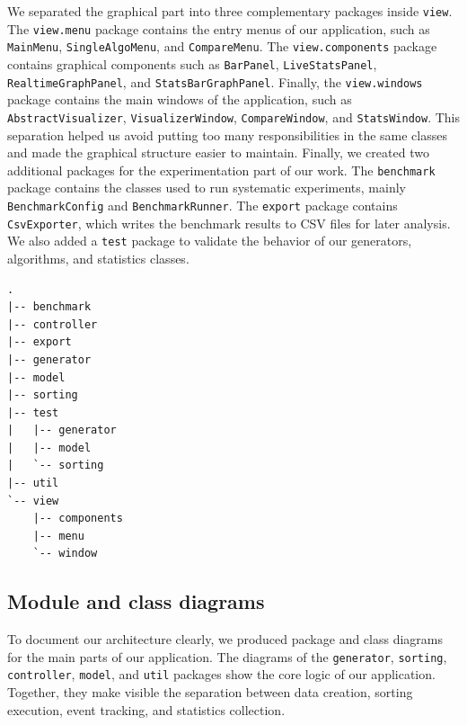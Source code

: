 \documentclass{article}
\begin{document}
We separated the graphical part into three complementary packages inside \texttt{view}. The \texttt{view.menu} package contains the entry menus of our 
application, such as \texttt{MainMenu}, \texttt{SingleAlgoMenu}, and \texttt{CompareMenu}. The \texttt{view.components} package contains graphical 
components such as \texttt{BarPanel}, \texttt{LiveStatsPanel}, \texttt{RealtimeGraphPanel}, and \texttt{StatsBarGraphPanel}. Finally, the \texttt{view.windows} package contains the main windows of the application, such 
as \texttt{AbstractVisualizer}, \texttt{VisualizerWindow}, \texttt{CompareWindow}, and \texttt{StatsWindow}. This separation helped us 
avoid putting too many responsibilities in the same classes and made the graphical 
structure easier to maintain.
Finally, we created two additional packages for the experimentation part of our 
work. The \texttt{benchmark} package contains the classes used to run systematic 
experiments, mainly \texttt{BenchmarkConfig} and \texttt{BenchmarkRunner}. 
The \texttt{export} package contains \texttt{CsvExporter}, which writes the 
benchmark results to CSV files for later analysis. We also added a \texttt{test} 
package to validate the behavior of our generators, algorithms, and statistics 
classes.
\begin{lstlisting}
.
|-- benchmark
|-- controller
|-- export
|-- generator
|-- model
|-- sorting
|-- test
|   |-- generator
|   |-- model
|   `-- sorting
|-- util
`-- view
    |-- components
    |-- menu
    `-- window
\end{lstlisting}

\subsection{Module and class diagrams}

\hspace*{1em}
To document our architecture clearly, we produced package and class diagrams for the main parts of our application. 
The diagrams of the \texttt{generator}, \texttt{sorting}, \texttt{controller}, \texttt{model}, and \texttt{util} packages show the core logic of our application. 
Together, they make visible the separation between data creation, sorting 
execution, event tracking, and statistics collection.
\end{document}
